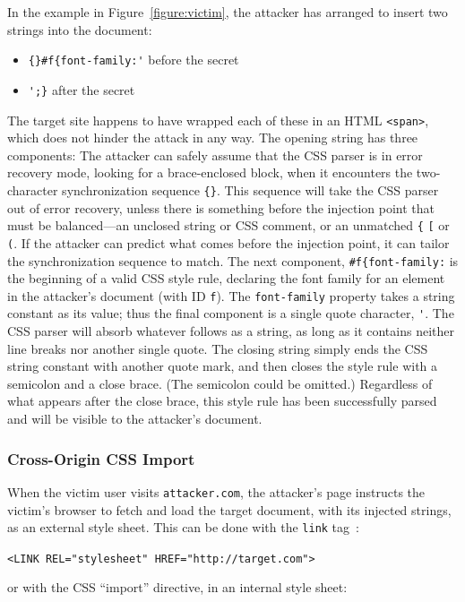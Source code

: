 \documentclass{sig-alternate}
\begin{document}
In the example in Figure~\ref{figure:victim}, the attacker has
arranged to insert two strings into the document:
\begin{itemize}
\item \verb|{}#f{font-family:'| before the secret
\item \verb|';}| after the secret
\end{itemize}
The target site happens to have wrapped each of these in an HTML
\verb|<span>|, which does not hinder the attack in any way.  The
opening string has three components: The attacker can safely assume
that the CSS parser is in error recovery mode, looking for a
brace-enclosed block, when it encounters the two-character
synchronization sequence \verb|{}|.  This sequence will take the CSS
parser out of error recovery, unless there is something before the
injection point that must be balanced---an unclosed string or CSS
comment, or an unmatched \verb|{| \verb|[| or \verb|(|.  If the
attacker can predict what comes before the injection point, it can
tailor the synchronization sequence to match.  The next component,
\verb|#f{font-family:| is the beginning of a valid CSS style rule,
declaring the font family for an element in the attacker's document
(with ID \texttt{f}). The \texttt{font-family} property takes a string
constant as its value; thus the final component is a single quote
character, \verb|'|.  The CSS parser will absorb whatever follows as a
string, as long as it contains neither line breaks nor another single
quote.  The closing string simply ends the CSS string constant with
another quote mark, and then closes the style rule with a semicolon
and a close brace.  (The semicolon could be omitted.)  Regardless of
what appears after the close brace, this style rule has been
successfully parsed and will be visible to the attacker's document.

\subsubsection{Cross-Origin CSS Import}
When the victim user visits \texttt{attacker.com}, the attacker's page
instructs the victim's browser to fetch and load the target document,
with its injected strings, as an external style sheet.  This can be
done with the \texttt{link} tag~\cite{html}:

\verb|<LINK REL="stylesheet" HREF="http://target.com">|

\noindent
or with the CSS “import” directive, in an internal style sheet:
\end{document}
